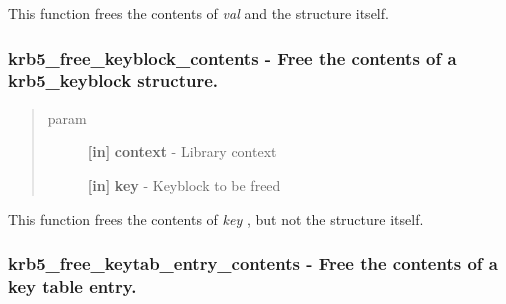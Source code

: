 \documentclass[letterpaper,10pt,english]{sphinxmanual}
\begin{document}
This function frees the contents of \emph{val} and the structure itself.


\subsubsection{krb5\_free\_keyblock\_contents -  Free the contents of a krb5\_keyblock structure.}
\label{appdev/refs/api/krb5_free_keyblock_contents::doc}\label{appdev/refs/api/krb5_free_keyblock_contents:krb5-free-keyblock-contents-free-the-contents-of-a-krb5-keyblock-structure}

\begin{fulllineitems}
\label{appdev/refs/api/krb5_free_keyblock_contents:c.krb5_free_keyblock_contents}
\end{fulllineitems}

\begin{quote}\begin{description}
\item[{param}] \leavevmode
\textbf{{[}in{]}} \textbf{context} - Library context

\textbf{{[}in{]}} \textbf{key} - Keyblock to be freed

\end{description}\end{quote}

This function frees the contents of \emph{key} , but not the structure itself.


\subsubsection{krb5\_free\_keytab\_entry\_contents -  Free the contents of a key table entry.}
\label{appdev/refs/api/krb5_free_keytab_entry_contents:krb5-free-keytab-entry-contents-free-the-contents-of-a-key-table-entry}\label{appdev/refs/api/krb5_free_keytab_entry_contents::doc}

\begin{fulllineitems}
\label{appdev/refs/api/krb5_free_keytab_entry_contents:c.krb5_free_keytab_entry_contents}
\end{fulllineitems}
\end{document}
